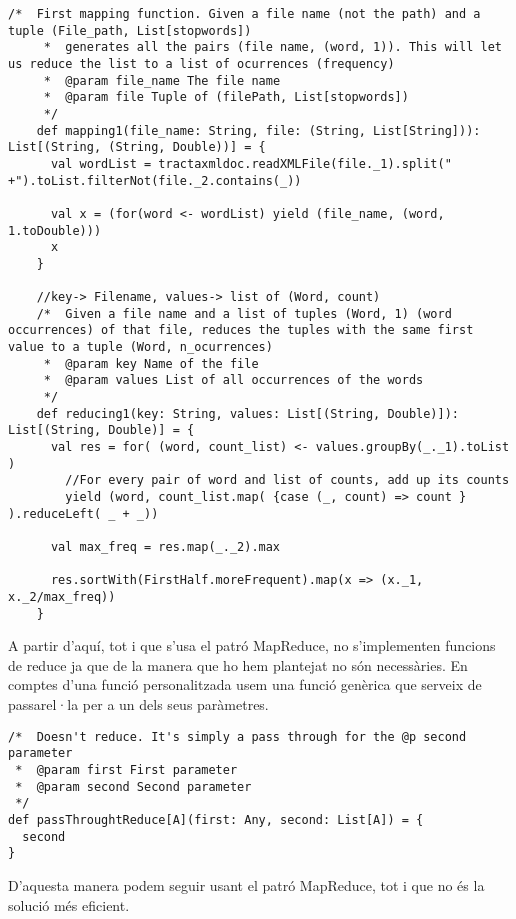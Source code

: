\documentclass{report}
\begin{document}
\begin{lstlisting}[style=scalaHighlight]
    /*  First mapping function. Given a file name (not the path) and a tuple (File_path, List[stopwords])
     *  generates all the pairs (file name, (word, 1)). This will let us reduce the list to a list of ocurrences (frequency)
     *  @param file_name The file name
     *  @param file Tuple of (filePath, List[stopwords])
     */
    def mapping1(file_name: String, file: (String, List[String])): List[(String, (String, Double))] = {
      val wordList = tractaxmldoc.readXMLFile(file._1).split(" +").toList.filterNot(file._2.contains(_))

      val x = (for(word <- wordList) yield (file_name, (word, 1.toDouble)))
      x
    }

    //key-> Filename, values-> list of (Word, count)
    /*  Given a file name and a list of tuples (Word, 1) (word occurrences) of that file, reduces the tuples with the same first value to a tuple (Word, n_ocurrences)
     *  @param key Name of the file
     *  @param values List of all occurrences of the words
     */
    def reducing1(key: String, values: List[(String, Double)]): List[(String, Double)] = {
      val res = for( (word, count_list) <- values.groupBy(_._1).toList )
        //For every pair of word and list of counts, add up its counts
        yield (word, count_list.map( {case (_, count) => count } ).reduceLeft( _ + _))

      val max_freq = res.map(_._2).max

      res.sortWith(FirstHalf.moreFrequent).map(x => (x._1, x._2/max_freq))
    }

\end{lstlisting}

A partir d'aquí, tot i que s'usa el patró MapReduce, no s'implementen funcions de reduce ja que de la manera que ho hem plantejat no són necessàries. En comptes d'una funció personalitzada usem una funció genèrica que serveix de passarel·la per a un dels seus paràmetres.

\begin{lstlisting}[style=scalaHighlight]
/*	Doesn't reduce. It's simply a pass through for the @p second parameter
 * 	@param first First parameter
 * 	@param second Second parameter
 */
def passThroughtReduce[A](first: Any, second: List[A]) = {
  second
}
\end{lstlisting}

D'aquesta manera podem seguir usant el patró MapReduce, tot i que no és la solució més eficient. \\
\end{document}
